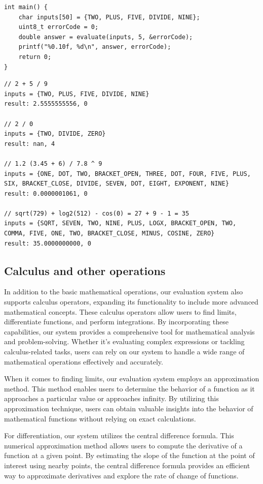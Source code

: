 \documentclass[a4paper, twoside]{report}
\begin{document}
\begin{verbatim}
int main() {
    char inputs[50] = {TWO, PLUS, FIVE, DIVIDE, NINE};
	uint8_t errorCode = 0;
	double answer = evaluate(inputs, 5, &errorCode);
	printf("%0.10f, %d\n", answer, errorCode);
    return 0;
}
\end{verbatim}

\begin{verbatim}
// 2 + 5 / 9
inputs = {TWO, PLUS, FIVE, DIVIDE, NINE} 
result: 2.5555555556, 0

// 2 / 0
inputs = {TWO, DIVIDE, ZERO} 
result: nan, 4

// 1.2 (3.45 + 6) / 7.8 ^ 9
inputs = {ONE, DOT, TWO, BRACKET_OPEN, THREE, DOT, FOUR, FIVE, PLUS, SIX, BRACKET_CLOSE, DIVIDE, SEVEN, DOT, EIGHT, EXPONENT, NINE}
result: 0.0000001061, 0

// sqrt(729) + log2(512) - cos(0) = 27 + 9 - 1 = 35
inputs = {SQRT, SEVEN, TWO, NINE, PLUS, LOGX, BRACKET_OPEN, TWO, COMMA, FIVE, ONE, TWO, BRACKET_CLOSE, MINUS, COSINE, ZERO}
result: 35.0000000000, 0
\end{verbatim}

\subsection{Calculus and other operations}
In addition to the basic mathematical operations, our evaluation system also supports calculus operators, expanding its functionality to include more advanced mathematical concepts. These calculus operators allow users to find limits, differentiate functions, and perform integrations. By incorporating these capabilities, our system provides a comprehensive tool for mathematical analysis and problem-solving. Whether it's evaluating complex expressions or tackling calculus-related tasks, users can rely on our system to handle a wide range of mathematical operations effectively and accurately.

When it comes to finding limits, our evaluation system employs an approximation method. This method enables users to determine the behavior of a function as it approaches a particular value or approaches infinity. By utilizing this approximation technique, users can obtain valuable insights into the behavior of mathematical functions without relying on exact calculations.

For differentiation, our system utilizes the central difference formula. This numerical approximation method allows users to compute the derivative of a function at a given point. By estimating the slope of the function at the point of interest using nearby points, the central difference formula provides an efficient way to approximate derivatives and explore the rate of change of functions.
\end{document}
